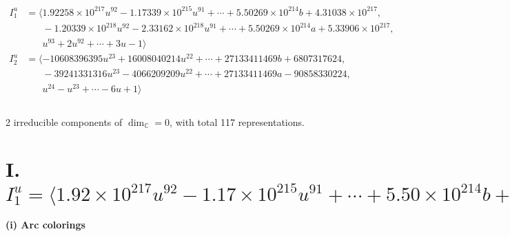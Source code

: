 \documentclass[1p]{elsarticle_modified}
\theoremstyle{definition}
\begin{document}
\begin{align*}
I^u_{1}&=\langle 
1.92258\times10^{217} u^{92}-1.17339\times10^{215} u^{91}+\cdots+5.50269\times10^{214} b+4.31038\times10^{217},\\
\phantom{I^u_{1}}&\phantom{= \langle  }-1.20339\times10^{218} u^{92}-2.33162\times10^{218} u^{91}+\cdots+5.50269\times10^{214} a+5.33906\times10^{217},\\
\phantom{I^u_{1}}&\phantom{= \langle  }u^{93}+2 u^{92}+\cdots+3 u-1\rangle \\
I^u_{2}&=\langle 
-10608396395 u^{23}+16008040214 u^{22}+\cdots+27133411469 b+6807317624,\\
\phantom{I^u_{2}}&\phantom{= \langle  }-39241331316 u^{23}-4066209209 u^{22}+\cdots+27133411469 a-90858330224,\\
\phantom{I^u_{2}}&\phantom{= \langle  }u^{24}- u^{23}+\cdots-6 u+1\rangle \\
\\
\end{align*}
\raggedright * 2 irreducible components of $\dim_{\mathbb{C}}=0$, with total 117 representations.\\
\newpage
\renewcommand{\arraystretch}{1}
\centering \section*{I. $I^u_{1}= \langle 1.92\times10^{217} u^{92}-1.17\times10^{215} u^{91}+\cdots+5.50\times10^{214} b+4.31\times10^{217},\;-1.20\times10^{218} u^{92}-2.33\times10^{218} u^{91}+\cdots+5.50\times10^{214} a+5.34\times10^{217},\;u^{93}+2 u^{92}+\cdots+3 u-1 \rangle$}
\flushleft \textbf{(i) Arc colorings}\\
\end{document}
